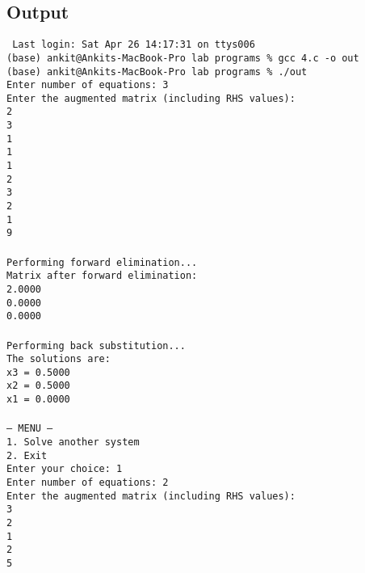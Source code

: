 \documentclass[12pt,a4paper]{article}
\begin{document}
\subsection*{Output}
\begin{tcolorbox}[terminalstyle, title=Sample Output]
\texttt{
Last login: Sat Apr 26 14:17:31 on ttys006\\
(base) ankit@Ankits-MacBook-Pro lab programs \% gcc 4.c -o out\\
(base) ankit@Ankits-MacBook-Pro lab programs \% ./out\\
Enter number of equations: 3\\
Enter the augmented matrix (including RHS values):\\
2\\
3\\
1\\
1\\
1\\
2\\
3\\
2\\
1\\
9\\
\\
Performing forward elimination...\\
Matrix after forward elimination:\\
2.0000   \\
0.0000   \\
0.0000   \\
\\
Performing back substitution...\\
The solutions are:\\
x3 = 0.5000\\
x2 = 0.5000\\
x1 = 0.0000\\
\\
--- MENU ---\\
1. Solve another system\\
2. Exit\\
Enter your choice: 1\\
Enter number of equations: 2\\
Enter the augmented matrix (including RHS values):\\
3\\
2\\
1\\
2\\
5\\
}
\end{tcolorbox}
\end{document}
